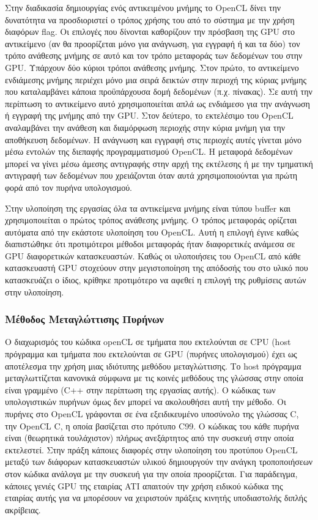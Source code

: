 Στην διαδικασία δημιουργίας ενός αντικειμένου μνήμης το OpenCL δίνει την δυνατότητα να προσδιοριστεί ο τρόπος χρήσης του από το σύστημα με την χρήση διαφόρων flag. Οι επιλογές που δίνονται καθορίζουν την πρόσβαση της GPU στο αντικείμενο (αν θα προορίζεται μόνο για ανάγνωση, για εγγραφή ή και τα δύο) τον τρόπο ανάθεσης μνήμης σε αυτό και τον τρόπο μεταφοράς των δεδομένων του στην GPU. Υπάρχουν δύο κύριοι τρόποι ανάθεσης μνήμης. Στον πρώτο, το αντικείμενο ενδιάμεσης μνήμης περιέχει μόνο μια σειρά δεικτών στην περιοχή της κύριας μνήμης που καταλαμβάνει κάποια προϋπάρχουσα δομή δεδομένων (π.χ. πίνακας). Σε αυτή την περίπτωση το αντικείμενο αυτό χρησιμοποιείται απλά ως ενδιάμεσο για την ανάγνωση ή εγγραφή της μνήμης από την GPU. Στον δεύτερο, το εκτελέσιμο του OpenCL αναλαμβάνει την ανάθεση και διαμόρφωση περιοχής στην κύρια μνήμη για την αποθήκευση δεδομένων. Η ανάγνωση και εγγραφή στις περιοχές αυτές γίνεται μόνο μέσω εντολών της διεπαφής προγραμματισμού OpenCL. Η μεταφορά δεδομένων μπορεί να γίνει μέσω άμεσης 
αντιγραφής στην αρχή της εκτέλεσης ή με την τμηματική αντιγραφή των δεδομένων που χρειάζονται όταν αυτά χρησιμοποιούνται για πρώτη φορά από τον πυρήνα υπολογισμού.

Στην υλοποίηση της εργασίας όλα τα αντικείμενα μνήμης είναι τύπου buffer και χρησιμοποιείται ο πρώτος τρόπος ανάθεσης μνήμης. Ο τρόπος μεταφοράς ορίζεται αυτόματα από την εκάστοτε υλοποίηση του OpenCL. Αυτή η επιλογή έγινε καθώς διαπιστώθηκε ότι  προτιμότεροι μέθοδοι μεταφοράς ήταν διαφορετικές ανάμεσα σε GPU διαφορετικών κατασκευαστών. Καθώς οι υλοποιήσεις του OpenCL από κάθε κατασκευαστή GPU στοχεύουν στην μεγιστοποίηση της απόδοσής του στο υλικό που κατασκευάζει ο ίδιος, κρίθηκε προτιμότερο να αφεθεί η επιλογή της ρυθμίσεις αυτών στην υλοποίηση.  

\subsubsection*{Μέθοδος Μεταγλώττισης Πυρήνων}

\noindent Ο διαχωρισμός του κώδικα openCL σε τμήματα που εκτελούνται σε CPU (host πρόγραμμα και τμήματα που εκτελούνται σε GPU (πυρήνες υπολογισμού) έχει ως αποτέλεσμα την χρήση μιας ιδιότυπης μεθόδου μεταγλώττισης. Το host πρόγραμμα μεταγλωττίζεται κανονικά σύμφωνα με τις κοινές μεθόδους της γλώσσας στην οποία είναι γραμμένο (C++ στην περίπτωση της εργασίας αυτής). Ο κώδικας των υπολογιστικών πυρήνων όμως δεν μπορεί να ακολουθήσει αυτή την μέθοδο. Οι πυρήνες στο OpenCL γράφονται σε ένα εξειδικευμένο υποσύνολο της γλώσσας C, την OpenCL C, η οποία βασίζεται στο πρότυπο C99. Ο κώδικας του κάθε πυρήνα είναι (θεωρητικά τουλάχιστον) πλήρως ανεξάρτητος από την συσκευή στην οποία εκτελεστεί. Στην πράξη κάποιες διαφορές στην υλοποίηση του προτύπου OpenCL μεταξύ των διάφορων κατασκευαστών υλικού δημιουργούν την ανάγκη τροποποιήσεων στον κώδικα ανάλογα με την συσκευή για την οποία προορίζεται. Για παράδειγμα, κάποιες γενιές GPU της εταιρίας ATI απαιτούν την χρήση ειδικού κώδικα της εταιρίας αυτής για να μπορέσουν να 
χειριστούν πράξεις κινητής υποδιαστολής διπλής ακρίβειας. 


